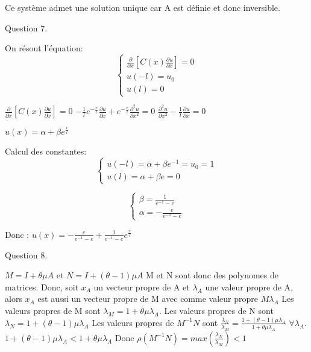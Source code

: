 \documentclass[a4paper,11pt]{article}
\begin{document}
    Ce système admet une solution unique car A est définie et donc inversible.
    \newline

    Question 7.

    On résout l'équation:
    $$\left\{
    \begin{array}{ll}
      \frac{\partial}{\partial x}[C(x)\frac{\partial u}{\partial x}] = 0 \\
      u(-l) = u_0 \\
      u(l) = 0
      \end{array}
    \right.
    $$

    $  \frac{\partial}{\partial x}[C(x)\frac{\partial u}{\partial x}] = 0 $
    $  -\frac{1}{l} e^{-\frac{x}{l}}\frac{\partial u}{\partial x} + e^{-\frac{x}{l}} \frac{\partial^2 u }{\partial x^2} = 0 $
    $ \frac{\partial^2 u}{\partial x^2} - \frac{1}{l} \frac{\partial u}{\partial x} = 0$

    $u(x) = \alpha + \beta e^{\frac{x}{l}} $

    Calcul des constantes:
    $$\left\{
      \begin{array}{ll}
        u(-l) = \alpha + \beta e^{-1} = u_0 = 1 \\
        u(l) = \alpha + \beta e = 0
      \end{array}
    \right.
    $$

    $$\left\{
      \begin{array}{ll}
        \beta = \frac{1}{e^{-1} - e} \\
        \alpha = -\frac{e}{e^{-1} - e}
      \end{array}
    \right.
    $$

    Donc :
    $u(x) = -\frac{e}{e^{-1} - e} + \frac{1}{e^{-1} - e} e^{\frac{x}{l}} $

    Question 8.
    \newline

    $M = I+ \theta \mu A$ et $N = I+(\theta - 1)\mu A$
    \newline
    M et N sont donc des polynomes de matrices.
    \newline
    Donc, soit $x_A$ un vecteur propre de A et $\lambda_A$ une valeur propre de A,
    alors $x_A$ est aussi un vecteur propre de M avec comme valeur propre $M\lambda_A$
    \newline
    Les valeurs propres de M sont $\lambda_M = 1+\theta \mu \lambda_A$.
    \newline
    Les valeurs propres de N sont $\lambda_N = 1+(\theta - 1)\mu \lambda_A$
    \newline
    Les valeurs propres de $M^{-1}N$ sont $\frac{\lambda_N}{\lambda_M} = \frac{1+(\theta - 1)\mu \lambda_A}{1+\theta \mu \lambda_A}$ $\forall \lambda_A$.
    $ 1+(\theta - 1)\mu \lambda_A < 1+\theta \mu \lambda_A$
    \newline
    Donc $\rho(M^{-1}N) = max(\frac{\lambda_N}{\lambda_M}) < 1$
    \newline
    \newline
    \vspace{12ex}
\end{document}
